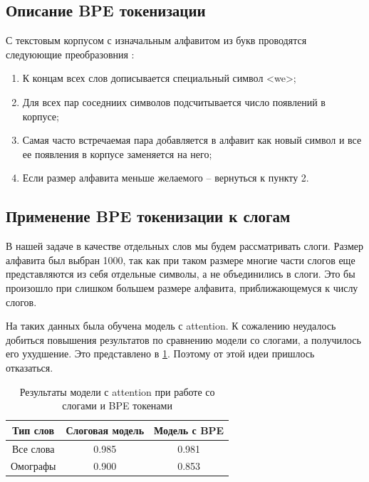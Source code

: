 \documentclass[14pt, a4paper, russian]{extreport}
\begin{document}
\subsection{Описание BPE токенизации}
С текстовым корпусом с изначальным алфавитом из букв проводятся следуюющие преобразовния \cite{sennrich}:
\begin{enumerate}[  1{)} ]
	\item К концам всех слов дописывается специальный символ <we>;
	\item Для всех пар соседниих символов подсчитывается число появлений в корпусе;
	\item Самая часто встречаемая пара добавляется в алфавит как новый символ и все ее появления в корпусе заменяется на него;
	\item Если размер алфавита меньше желаемого --  вернуться к пункту 2.
\end{enumerate}

\subsection{Применение BPE токенизации к слогам}
В нашей задаче в качестве отдельных слов мы будем рассматривать слоги. Размер алфавита был выбран 1000, так как при таком размере многие части слогов еще представляются из себя отдельные символы, а не объединились в слоги. Это бы произошло при слишком большем размере алфавита, приближающемуся к числу слогов.

На таких данных была обучена модель с attention. К сожалению неудалось добиться повышения результатов по сравнению модели со слогами, а получилось его ухудшение. Это представлено в \cref{table:bpe}. Поэтому от этой идеи пришлось отказаться.


\begin{table}[H]
	\caption{Результаты модели с attention при работе со слогами и BPE токенами}
	
	\begin{small}
		\begin{center}
			\begin{tabular}{|c | c | c|}
				\hline
				Тип слов  & Слоговая модель & Модель с BPE \\ \hline
				Все слова & 0.985           & 0.981        \\ \hline
				Омографы  & 0.900           & 0.853        \\ \hline
			\end{tabular}
		\end{center}
	\end{small}
	\label{table:bpe}
\end{table}
\end{document}
